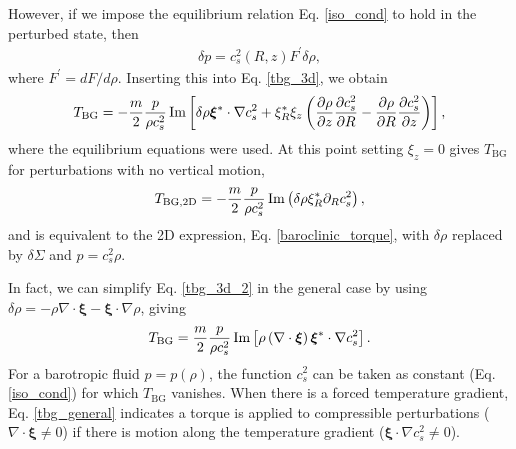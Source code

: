 However, if we impose the equilibrium relation
Eq. \ref{iso_cond} to hold in the perturbed state, then
\begin{align}
  \delta p = c_s^2(R,z) F^\prime \delta\rho,
\end{align}
where $F^\prime = dF/d\rho$. Inserting this into Eq. \ref{tbg_3d}, we
obtain
\begin{align}\label{tbg_3d_2}
  T_\mathrm{BG} = -\frac{m}{2}\frac{p}{\rho
    c_s^2}\operatorname{Im}\left[\delta\rho\bm{\xi}^*\cdot\nabla c_s^2 +
    \xi_R^*\xi_z \left(\frac{\partial\rho}{\partial z}\frac{\partial c_s^2}{\partial R} -
      \frac{\partial\rho}{\partial R}\frac{\partial c_s^2}{\partial z}\right)\right],
\end{align}
where the equilibrium equations were used. 
At this point setting $\xi_z=0$ gives $T_\mathrm{BG}$ for
perturbations with no vertical motion, 
\begin{align}
  T_\mathrm{BG,2D} = -\frac{m}{2}\frac{p}{\rho
    c_s^2}\operatorname{Im}\left(\delta\rho \xi_R^*  \partial_R c_s^2 \right),
\end{align}
and is equivalent to the 2D
expression, Eq. \ref{baroclinic_torque}, with $\delta\rho $ replaced
by $\delta \Sigma$ and $p=c_s^2\rho$. %

In fact, we can simplify Eq. \ref{tbg_3d_2} in the general case by
using $\delta\rho = - \rho\nabla\cdot\bm{\xi} -
\bm{\xi}\cdot\nabla\rho$, giving
\begin{align}\label{tbg_general}
  T_\mathrm{BG} = \frac{m}{2}\frac{p}{\rho
    c_s^2}\operatorname{Im}\left[\rho\left(\nabla\cdot\bm{\xi}\right)\bm{\xi}^*\cdot\nabla
  c_s^2\right].  
\end{align} 
For a barotropic fluid $p=p(\rho)$, the function $c_s^2$ can be
taken as constant (Eq. \ref{iso_cond}) for which $T_\mathrm{BG}$
vanishes. When there is a forced temperature gradient,
Eq. \ref{tbg_general} indicates a torque is applied to compressible
perturbations ($\nabla\cdot\bm{\xi}\neq0$) if there is motion along
the temperature gradient ($\bm{\xi}\cdot\nabla c_s^2 \neq 0$).   




